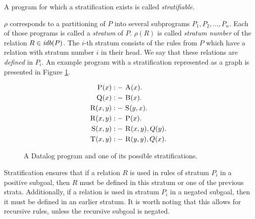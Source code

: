 A program for which a stratification exists is called \emph{stratifiable}. 


$\rho$ corresponds to a partitioning of $P$ into several subprograms $P_1, P_2, \dots, P_n$. Each of those programs is called a \emph{stratum} of $P$. $\rho(R)$ is called \emph{stratum number} of the relation $R \in \textit{idb}(P )$. The $i$-th stratum consists of the rules from $P$ which have a relation with stratum number $i$ in their head. We say that these relations are \emph{defined} in $P_i$. An example program with a stratification represented as a graph is presented in Figure \ref{fig:precedgraph}.

\begin{figure}[!htbp]
\begin{minipage}{0.5\linewidth}
\begin{align*}
\textsc{P}(x) &:-~ \textsc{A}(x).\\
\textsc{Q}(x) &:-~ \textsc{B}(x).\\
\textsc{R}(x, y) &:-~ \textsc{S}(y, x).\\
\textsc{R}(x, y) &:-~ \textsc{P}(x).\\
\textsc{S}(x, y) &:-~ \textsc{R}(x, y), Q(y).\\
\textsc{T}(x, y) &:-~ \textsc{R}(y, y), Q(x).\\
\end{align*}
\end{minipage}%
\begin{minipage}{0.5\linewidth}

\end{minipage}%
\caption{A Datalog program and one of its possible stratifications.}\label{fig:precedgraph}
\end{figure}

Stratification ensures that if a relation $R$ is used in rules of stratum $P_i$ in a positive subgoal, then $R$ must be defined in this stratum or one of the previous strata. Additionally, if a relation is used in stratum $P_i$ in a negated subgoal, then it must be defined in an earlier stratum. It is worth noting that this allows for recursive rules, unless the recursive subgoal is negated.

